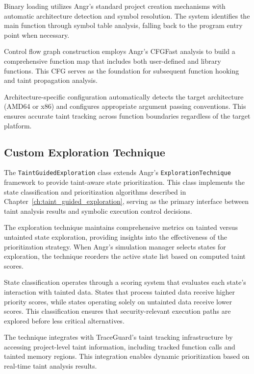 Binary loading utilizes Angr's standard project creation mechanisms with automatic architecture detection and symbol resolution. The system identifies the main function through symbol table analysis, falling back to the program entry point when necessary.

Control flow graph construction employs Angr's CFGFast analysis to build a comprehensive function map that includes both user-defined and library functions. This CFG serves as the foundation for subsequent function hooking and taint propagation analysis.

Architecture-specific configuration automatically detects the target architecture (AMD64 or x86) and configures appropriate argument passing conventions. This ensures accurate taint tracking across function boundaries regardless of the target platform.

\subsection{Custom Exploration Technique}

The \texttt{TaintGuidedExploration} class extends Angr's \texttt{ExplorationTechnique} framework to provide taint-aware state prioritization. This class implements the state classification and prioritization algorithms described in Chapter~\ref{ch:taint_guided_exploration}, serving as the primary interface between taint analysis results and symbolic execution control decisions.

The exploration technique maintains comprehensive metrics on tainted versus untainted state exploration, providing insights into the effectiveness of the prioritization strategy. When Angr's simulation manager selects states for exploration, the technique reorders the active state list based on computed taint scores.

State classification operates through a scoring system that evaluates each state's interaction with tainted data. States that process tainted data receive higher priority scores, while states operating solely on untainted data receive lower scores. This classification ensures that security-relevant execution paths are explored before less critical alternatives.

The technique integrates with TraceGuard's taint tracking infrastructure by accessing project-level taint information, including tracked function calls and tainted memory regions. This integration enables dynamic prioritization based on real-time taint analysis results.

